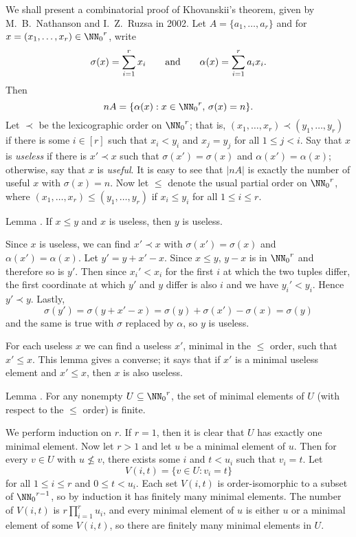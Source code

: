 We shall present a combinatorial proof of Khovanskii's theorem,
given by M.~B.~Nathanson and I.~Z.~Ruzsa in 2002.
Let $A = \{a_1,\ldots, a_r\}$ and
for $x = (x_1,\ldots, x_r)\in {\NN_0}^r$, write
$$\sigma(x) = \sum_{i=1}^r x_i\qquad\hbox{and}\qquad
\alpha(x) = \sum_{i=1}^r a_ix_i.$$
Then
$$nA = \{ \alpha(x) : x\in {\NN_0}^r,\, \sigma(x) = n\}.$$
Let $\prec$ be the lexicographic order on ${\NN_0}^r$; that is, $(x_1,\ldots,x_r)\prec (y_1,\ldots,y_r)$
if there is some $i\in [r]$ such that $x_i<y_i$ and $x_j = y_j$ for all $1\le j<i$.
Say that $x$ is {\it useless} if there is $x'\prec x$ such that $\sigma(x') = \sigma(x)$ and
$\alpha(x') = \alpha(x)$; otherwise, say that $x$ is {\it useful}. It is easy to see that
$|nA|$ is exactly the number of useful $x$ with $\sigma(x) = n$. Now let $\le$ denote
the usual partial order on ${\NN_0}^r$, where $(x_1,\ldots,x_r)\le (y_1,\ldots,y_r)$
if $x_i\le y_i$ for all $1\le i\le r$.

\proclaim Lemma {\advthm}. If $x\le y$ and $x$ is useless, then $y$ is useless.

\proof Since $x$ is useless, we can find $x'\prec x$ with $\sigma(x') = \sigma(x)$ and $\alpha(x') = \alpha(x)$.
Let $y' = y+x'-x$. Since $x\le y$, $y-x$ is in ${\NN_0}^r$ and therefore so is $y'$. Then since
$x_i' < x_i$ for the first $i$ at which the two tuples differ, the first coordinate at which $y'$ and
$y$ differ is also $i$ and we have $y_i'<y_i$. Hence $y'\prec y$. Lastly,
$$\sigma(y') = \sigma(y+x'-x) = \sigma(y) + \sigma(x') - \sigma(x) = \sigma(y)$$
and the same is true with $\sigma$ replaced by $\alpha$, so $y$ is useless.\slug

For each useless $x$ we can find a useless $x'$, minimal in the $\le$ order, such that $x'\le x$.
This lemma gives a converse; it says that if $x'$ is a minimal useless element and $x'\le x$, then
$x$ is also useless.

\edef\lemminimalfinite{\the\thmcount}
\proclaim Lemma {\advthm}. For any nonempty $U\subseteq {\NN_0}^r$, the set of minimal elements of
$U$ (with respect to the $\le$ order) is finite.

\proof We perform induction on $r$. If $r=1$, then it is clear that $U$ has exactly one minimal element.
Now let $r>1$ and let $u$ be a minimal element of $u$. Then for every $v\in U$ with $u\not\le v$,
there exists some $i$ and $t< u_i$ such that $v_i = t$. Let
$$V(i,t) = \{v\in U : v_i = t\}$$
for all $1\le i\le r$ and $0\le t<u_i$. Each set $V(i,t)$ is order-isomorphic to a subset of ${\NN_0}^{r-1}$,
so by induction it has finitely many minimal elements. The number of $V(i,t)$ is $r\prod_{i=1}^r u_i$,
and every minimal element of $u$ is either $u$ or a minimal element of some $V(i,t)$, so there are
finitely many minimal elements in $U$.\slug

